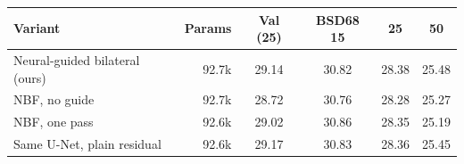 \begin{tabular}{lrcccc}
\toprule
Variant & Params & Val (25) & BSD68 15 & 25 & 50 \\
\midrule
Neural-guided bilateral (ours) & 92.7k & 29.14 & 30.82 & 28.38 & 25.48 \\
NBF, no guide & 92.7k & 28.72 & 30.76 & 28.28 & 25.27 \\
NBF, one pass & 92.6k & 29.02 & 30.86 & 28.35 & 25.19 \\
Same U-Net, plain residual & 92.6k & 29.17 & 30.83 & 28.36 & 25.45 \\
\bottomrule
\end{tabular}
